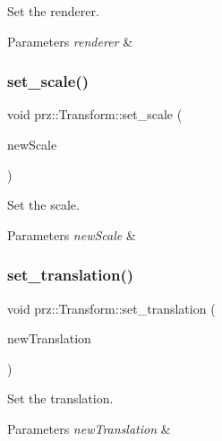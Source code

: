 Set the renderer. 


\begin{DoxyParams}{Parameters}
{\em renderer} & \\
\hline
\end{DoxyParams}
\mbox{\label{classprz_1_1_transform_ae2672232dfdeedb5952793fd52fc6bf6}} 
\subsubsection{\texorpdfstring{set\_scale()}{set\_scale()}}
{\footnotesize\ttfamily void prz\+::\+Transform\+::set\+\_\+scale (\begin{DoxyParamCaption}\item[{const P\+Vec3 \&}]{new\+Scale }\end{DoxyParamCaption})}



Set the scale. 


\begin{DoxyParams}{Parameters}
{\em new\+Scale} & \\
\hline
\end{DoxyParams}
\mbox{\label{classprz_1_1_transform_a918637af3605f6cff9ad6ac6f7094158}} 
\subsubsection{\texorpdfstring{set\_translation()}{set\_translation()}}
{\footnotesize\ttfamily void prz\+::\+Transform\+::set\+\_\+translation (\begin{DoxyParamCaption}\item[{const P\+Vec3 \&}]{new\+Translation }\end{DoxyParamCaption})}



Set the translation. 


\begin{DoxyParams}{Parameters}
{\em new\+Translation} & \\
\hline
\end{DoxyParams}
\mbox{\label{classprz_1_1_transform_a46563ee73c1091eaf544f88271fed16e}} 
